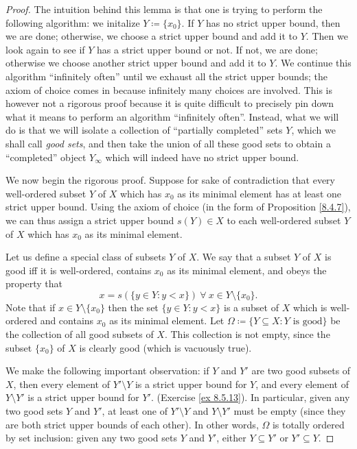 \begin{proof}
    The intuition behind this lemma is that one is trying to perform the following algorithm:
    we initalize \(Y \coloneqq \{x_0\}\).
    If \(Y\) has no strict upper bound, then we are done;
    otherwise, we choose a strict upper bound and add it to \(Y\).
    Then we look again to see if \(Y\) has a strict upper bound or not.
    If not, we are done;
    otherwise we choose another strict upper bound and add it to \(Y\).
    We continue this algorithm ``infinitely often'' until we exhaust all the strict upper bounds;
    the axiom of choice comes in because infinitely many choices are involved.
    This is however not a rigorous proof because it is quite difficult to precisely pin down what it means to perform an algorithm ``infinitely often''.
    Instead, what we will do is that we will isolate a collection of ``partially completed'' sets \(Y\), which we shall call \emph{good sets}, and then take the union of all these good sets to obtain a ``completed'' object \(Y_{\infty}\) which will indeed have no strict upper bound.

    We now begin the rigorous proof.
    Suppose for sake of contradiction that every well-ordered subset \(Y\) of \(X\) which has \(x_0\) as its minimal element has at least one strict upper bound.
    Using the axiom of choice (in the form of Proposition \ref{8.4.7}), we can thus assign a strict upper bound \(s(Y) \in X\) to each well-ordered subset \(Y\) of \(X\) which has \(x_0\) as its minimal element.

    Let us define a special class of subsets \(Y\) of \(X\).
    We say that a subset \(Y\) of \(X\) is good iff it is well-ordered, contains \(x_0\) as its minimal element, and obeys the property that
    \[
        x = s(\{y \in Y : y < x\}) \ \forall\ x \in Y \setminus \{x_0\}.
    \]
    Note that if \(x \in Y \setminus \{x_0\}\) then the set \(\{y \in Y : y < x\}\) is a subset of \(X\) which is well-ordered and contains \(x_0\) as its minimal element.
    Let \(\Omega \coloneqq \{Y \subseteq X : Y \text{ is good}\}\) be the collection of all good subsets of \(X\).
    This collection is not empty, since the subset \(\{x_0\}\) of \(X\) is clearly good
    (which is vacuously true).

    We make the following important observation:
    if \(Y\) and \(Y'\) are two good subsets of \(X\), then every element of \(Y' \setminus Y\) is a strict upper bound for \(Y\), and every element of \(Y \setminus Y'\) is a strict upper bound for \(Y'\).
    (Exercise \ref{ex 8.5.13}).
    In particular, given any two good sets \(Y\) and \(Y'\), at least one of \(Y' \setminus Y\) and \(Y \setminus Y'\) must be empty
    (since they are both strict upper bounds of each other).
    In other words, \(\Omega\) is totally ordered by set inclusion:
    given any two good sets \(Y\) and \(Y'\), either \(Y \subseteq Y'\) or \(Y' \subseteq Y\).


\end{proof}
